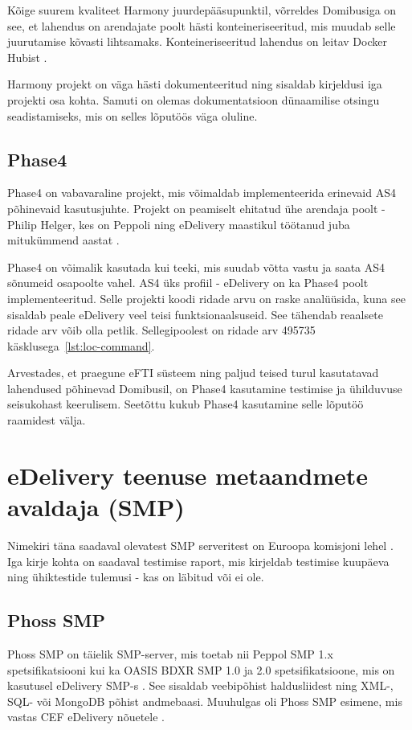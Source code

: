 Kõige suurem kvaliteet Harmony juurdepääsupunktil, 
võrreldes Domibusiga on see, et lahendus on arendajate poolt hästi konteineriseeritud, 
mis muudab selle juurutamise kõvasti lihtsamaks. 
Konteineriseeritud lahendus on leitav Docker Hubist \cite{niis_harmony_ap_docker}.

Harmony projekt on väga hästi dokumenteeritud ning sisaldab kirjeldusi iga projekti osa kohta.
Samuti on olemas dokumentatsioon dünaamilise otsingu seadistamiseks, mis on selles lõputöös väga oluline.

\subsection{Phase4}
Phase4 \cite{phax_phase4_as4_library} on vabavaraline projekt, mis võimaldab implementeerida erinevaid AS4 põhinevaid kasutusjuhte.
Projekt on peamiselt ehitatud ühe arendaja poolt - Philip Helger, 
kes on Peppoli ning eDelivery maastikul töötanud juba mitukümmend aastat \cite{helger_linkedin}.

Phase4 on võimalik kasutada kui teeki, mis suudab võtta vastu ja saata AS4 sõnumeid osapoolte vahel.
AS4 üks profiil - eDelivery on ka Phase4 poolt implementeeritud. 
Selle projekti koodi ridade arvu on raske analüüsida, kuna see sisaldab peale eDelivery veel teisi funktsionaalsuseid.
See tähendab reaalsete ridade arv võib olla petlik.
Sellegipoolest on ridade arv 495735 käsklusega~\ref{lst:loc-command}.

Arvestades, et praegune eFTI süsteem ning paljud teised turul kasutatavad lahendused põhinevad Domibusil,
on Phase4 kasutamine testimise ja ühilduvuse seisukohast keerulisem. Seetõttu kukub Phase4 kasutamine selle lõputöö raamidest välja.

\section{eDelivery teenuse metaandmete avaldaja (SMP)}\label{smp-components-analysis}
Nimekiri täna saadaval olevatest SMP serveritest on Euroopa komisjoni lehel \cite{ec_edelivery_smp_conformant_solutions}.
Iga kirje kohta on saadaval testimise raport, 
mis kirjeldab testimise kuupäeva ning ühiktestide tulemusi - kas on läbitud või ei ole.

\subsection{Phoss SMP}
Phoss SMP on täielik SMP-server, mis toetab nii Peppol SMP 1.x spetsifikatsiooni 
kui ka OASIS BDXR SMP 1.0 ja 2.0 spetsifikatsioone, mis on kasutusel eDelivery SMP-s \cite{ec_edelivery_smp_2.0}. 
See sisaldab veebipõhist haldusliidest ning XML-, SQL- või MongoDB põhist andmebaasi. 
Muuhulgas oli Phoss SMP esimene, mis vastas CEF eDelivery nõuetele \cite{phax_phoss_smp}.

